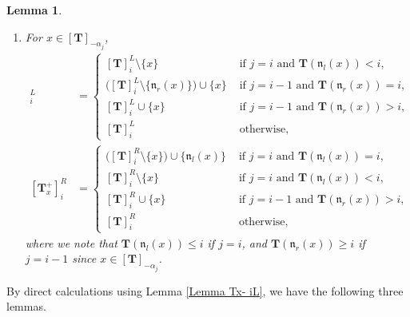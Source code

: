 \documentclass[12pt]{amsart}
\newtheorem{lem}[thm]{Lemma}
\numberwithin{equation}{thm}
\newcommand\bT{\mathbf T}
\newcommand\fn{\mathfrak n}
\renewcommand\a{\alpha}  %
\begin{document}
\begin{lem}
\begin{enumerate}
\item 
For $x \in [\bT]_{-\a_j}$,  
\begin{align*}
[\bT_x^+]_i^L 
	&= \begin{cases}
		[\bT]_i^L \setminus \{x\} 
			& \text{ if }j=i \text{ and } \bT(\fn_l(x)) <i, 
		\\
		\big( [\bT]_i^L \setminus \{\fn_r(x)\} \big) \cup \{x\} 
			& \text{ if } j=i-1 \text{ and } \bT(\fn_r(x)) =i, 
		\\
		[\bT]_i^L \cup \{x\} 
			& \text{ if } j=i-1 \text{ and } \bT(\fn_r(x)) >i, 
		\\
		[\bT]_i^L 
			& \text{ otherwise},  
	\end{cases}
\\
[\bT_x^+]_i^R 
	& = \begin{cases}
	\big( [\bT]_i^R \setminus \{x\} \big) \cup \{ \fn_l(x) \} 
		& \text{ if } j=i \text{ and } \bT (\fn_l(x)) =i, 
	\\
	[\bT]_i^R \setminus \{x\} 
		& \text{ if } j=i \text{ and } \bT (\fn_l(x)) < i, 
	\\
	[\bT]_i^R \cup \{x\} 
		& \text{ if } j=i-1 \text{ and } \bT(\fn_r(x))>i, 
	\\
	[\bT]_i^R 
		& \text{ otherwise}, 
	\end{cases}
\end{align*}
where we note that 
$\bT(\fn_l(x)) \leq i$ if $j=i$, and $\bT(\fn_r(x)) \geq i$ if $j=i-1$ since $x \in [\bT]_{-\a_j}$. 
\end{enumerate} 
\end{lem} 


By direct calculations using Lemma \ref{Lemma Tx- iL}, we have the following three lemmas.   
\end{document}
